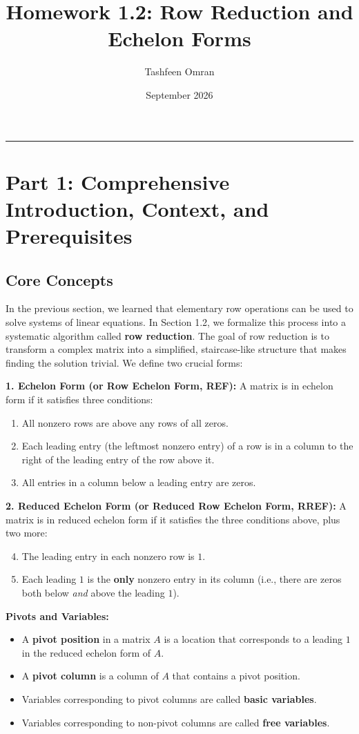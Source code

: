 \documentclass[11pt]{article}
\title{\textbf{Homework 1.2: Row Reduction and Echelon Forms}}
\author{Tashfeen Omran}
\date{September 2026}
\begin{document}
\maketitle
\tableofcontents
\vspace{1cm}
\hrule
\vspace{1cm}

\section{Part 1: Comprehensive Introduction, Context, and Prerequisites}

\subsection{Core Concepts}
In the previous section, we learned that elementary row operations can be used to solve systems of linear equations. In Section 1.2, we formalize this process into a systematic algorithm called \textbf{row reduction}. The goal of row reduction is to transform a complex matrix into a simplified, staircase-like structure that makes finding the solution trivial. We define two crucial forms:

\textbf{1. Echelon Form (or Row Echelon Form, REF):}
A matrix is in echelon form if it satisfies three conditions:
\begin{enumerate}
    \item All nonzero rows are above any rows of all zeros.
    \item Each leading entry (the leftmost nonzero entry) of a row is in a column to the right of the leading entry of the row above it.
    \item All entries in a column below a leading entry are zeros.
\end{enumerate}

\textbf{2. Reduced Echelon Form (or Reduced Row Echelon Form, RREF):}
A matrix is in reduced echelon form if it satisfies the three conditions above, plus two more:
\begin{enumerate}
    \setcounter{enumi}{3}
    \item The leading entry in each nonzero row is $1$.
    \item Each leading $1$ is the \textbf{only} nonzero entry in its column (i.e., there are zeros both below \textit{and} above the leading $1$).
\end{enumerate}

\textbf{Pivots and Variables:}
\begin{itemize}
    \item A \textbf{pivot position} in a matrix $A$ is a location that corresponds to a leading $1$ in the reduced echelon form of $A$.
    \item A \textbf{pivot column} is a column of $A$ that contains a pivot position.
    \item Variables corresponding to pivot columns are called \textbf{basic variables}.
    \item Variables corresponding to non-pivot columns are called \textbf{free variables}.
\end{itemize}
\end{document}
